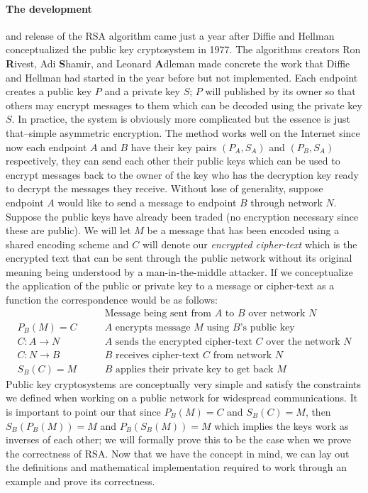 \documentclass[12pt]{article}
\theoremstyle{remark}
\begin{document}
\paragraph{The development} and release of the RSA algorithm came just a year after Diffie and Hellman conceptualized the public key cryptosystem in 1977.  The algorithms creators Ron \textbf{R}ivest, Adi \textbf{S}hamir, and Leonard \textbf{A}dleman made concrete the work that Diffie and Hellman had started in the year before but not implemented.  Each endpoint creates a public key $P$ and a private key $S$; $P$ will published by its owner so that others may encrypt messages to them which can be decoded using the private key $S$.  In practice, the system is obviously more complicated but the essence is just that--simple asymmetric encryption.  The method works well on the Internet since now each endpoint $A$ and $B$ have their key pairs $(P_A,S_A)$ and $(P_B, S_A)$ respectively, they can send each other their public keys which can be used to encrypt messages back to the owner of the key who has the decryption key ready to decrypt the messages they receive.  Without lose of generality, suppose endpoint $A$ would like to send a message to endpoint $B$ through network $N$.  Suppose the public keys have already been traded (no encryption necessary since these are public).  We will let $M$ be a message that has been encoded using a shared encoding scheme and $C$ will denote our \textit{encrypted cipher-text} which is the encrypted text that can be sent through the public network without its original meaning being understood by a man-in-the-middle attacker.  If we conceptualize the application of the public or private key to a message or cipher-text as a function the correspondence would be as follows:
\begin{align*}
&\qquad\text{Message being sent from $A$ to $B$ over network $N$}\\
P_B(M)=C	&\qquad\text{$A$ encrypts message $M$ using $B$'s public key}\\
C: A\rightarrow N	&\qquad\text{$A$ sends the encrypted cipher-text $C$ over the network $N$}\\
C: N\rightarrow B	&\qquad\text{$B$ receives cipher-text $C$ from network $N$}\\
S_B(C)=M	&\qquad\text{$B$ applies their private key to get back $M$} 
\end{align*}
Public key cryptosystems are conceptually very simple and satisfy the constraints we defined when working on a public network for widespread communications.  It is important to point our that since $P_B(M)=C$ and $S_B(C)=M$, then $S_B(P_B(M))=M$ and $P_B(S_B(M))=M$ which implies the keys work as inverses of each other; we will formally prove this to be the case when we prove the correctness of RSA.  Now that we have the concept in mind, we can lay out the definitions and mathematical implementation required to work through an example and prove its correctness.
\end{document}
